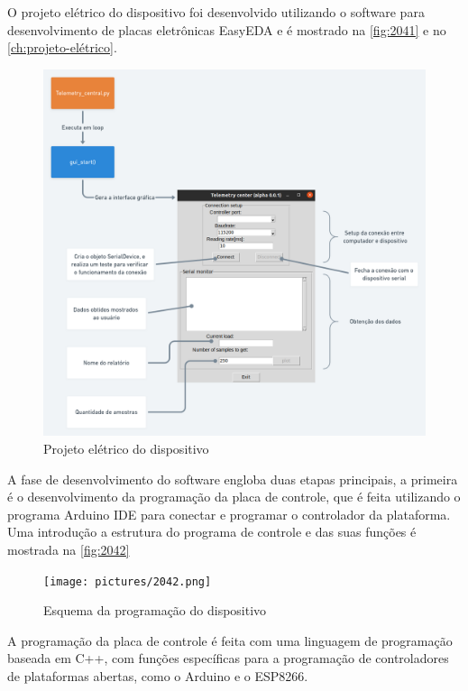 O projeto elétrico do dispositivo foi desenvolvido utilizando o software para desenvolvimento de placas eletrônicas EasyEDA e é mostrado na \autoref{fig:2041} e no \autoref{ch:projeto-elétrico}.

\begin{figure}[H]
	\caption{\label{fig:2041} Projeto elétrico do dispositivo}
	\begin{center}
		\includegraphics[width=\textwidth]{pictures/2041.png}
	\end{center}
\end{figure}

A fase de desenvolvimento do software engloba duas etapas principais, a primeira é o desenvolvimento da programação da placa de controle,
que é feita utilizando o programa Arduino IDE para conectar e programar o controlador da plataforma.
Uma introdução a estrutura do programa de controle e das suas funções é mostrada na \autoref{fig:2042}

\begin{figure}[H]
	\caption{\label{fig:2042} Esquema da programação do dispositivo}
	\begin{center}
		\texttt{[image: pictures/2042.png]}
	\end{center}
\end{figure}

A programação da placa de controle é feita com uma linguagem de programação baseada em C++, com funções específicas para a programação de controladores de
plataformas abertas, como o Arduino e o ESP8266.

